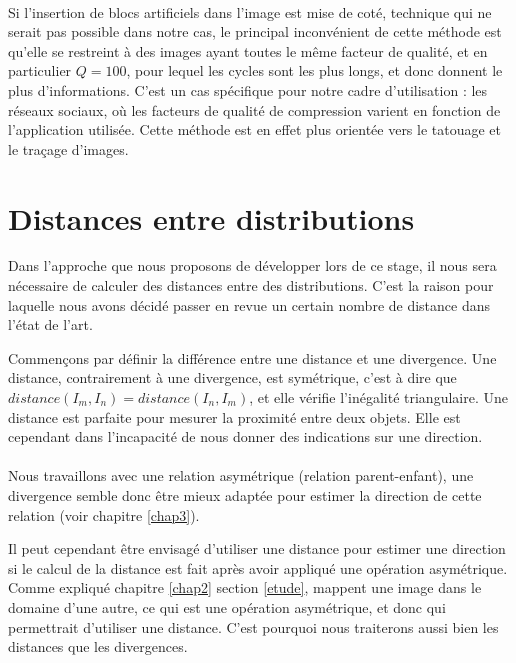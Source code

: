 \documentclass[utf8,final]{stageM2R} %
\begin{document}
\paragraph{}

Si l'insertion de blocs artificiels dans l'image est mise de coté, technique qui ne serait pas possible dans notre cas, le principal inconvénient de cette méthode 
 est qu'elle se restreint à des images ayant toutes le même facteur de qualité, et en particulier $Q = 100$, pour lequel les cycles sont les plus longs, et donc donnent le plus d'informations. C'est un cas spécifique pour notre cadre d'utilisation : les réseaux sociaux, où les facteurs de qualité de compression varient en fonction de l'application utilisée. Cette méthode est en effet plus orientée vers le tatouage et le traçage d'images.

\section{Distances entre distributions}

Dans l'approche que nous proposons de développer lors de ce stage, il nous sera nécessaire de calculer des distances entre des distributions. C'est la raison pour laquelle nous avons décidé passer en revue un certain nombre de distance dans l'état de l'art.

Commençons par définir la différence entre une distance et une divergence. Une distance, contrairement à une divergence, est symétrique, c'est à dire que $distance(I_{m},I_{n}) = distance(I_{n},I_{m})$, et elle vérifie l'inégalité triangulaire. Une distance est parfaite pour mesurer la proximité entre deux objets. Elle est cependant dans l'incapacité de nous donner des indications sur une direction.

\paragraph{}

Nous travaillons avec une relation asymétrique (relation parent-enfant), une divergence semble donc être mieux adaptée pour estimer la direction de cette relation (voir chapitre \ref{chap3}).

Il peut cependant être envisagé d'utiliser une distance pour estimer une direction si le calcul de la distance est fait après avoir appliqué une opération asymétrique. Comme expliqué chapitre \ref{chap2} section \ref{etude},  mappent une image dans le domaine d'une autre, ce qui est une opération asymétrique, et donc qui permettrait d'utiliser une distance. C'est pourquoi nous traiterons aussi bien les distances que les divergences.
\end{document}
